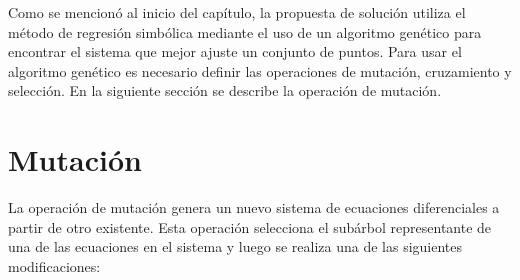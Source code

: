 Como se mencionó al inicio del capítulo, la propuesta de solución utiliza el método de regresión simbólica mediante el uso de un algoritmo genético para encontrar el sistema que mejor ajuste un conjunto de puntos. Para usar el algoritmo genético es necesario definir las operaciones de mutación, cruzamiento y selección. En la siguiente sección se describe la operación de mutación.

\section{Mutación}\label{section:mutation}

La operación de mutación genera un nuevo sistema de ecuaciones diferenciales a partir de otro existente. Esta operación selecciona el subárbol representante de una de las ecuaciones en el sistema y luego se realiza una de las siguientes modificaciones:

